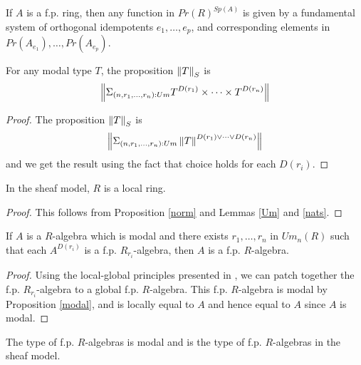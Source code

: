     \begin{corollary}
      If $A$ is a f.p. ring, then any function in $Pr(R)^{Sp(A)}$ is given by
      a fundamental system of orthogonal idempotents $e_1,\dots,e_p$, and corresponding elements in $Pr(A_{e_1}),\dots,Pr(A_{e_p})$.
    \end{corollary}
    
    \begin{proposition}\label{norm}
      For any modal type $T$, the proposition $\left\lVert T \right\rVert_S$ is
      $$\left\lVert \Sigma_{(n,r_1,\dots,r_n):Um}T^{D(r_1)}\times\dots\times T^{D(r_n)} \right\rVert$$
    \end{proposition}
    
    \begin{proof}
      The proposition $\left\lVert T \right\rVert_S$ is
      $$\left\lVert \Sigma_{(n,r_1,\dots,r_n):Um}\left\lVert T \right\rVert^{D(r_1)\vee\dots\vee D(r_n)} \right\rVert$$
      and we get the result using the fact that choice holds for each $D(r_i)$.
    \end{proof}
    
    \begin{proposition}
      In the sheaf model, $R$ is a local ring.
    \end{proposition}

    \begin{proof}
      This follows from Proposition \ref{norm} and Lemmas \ref{Um} and \ref{nats}.
    \end{proof}

    \begin{lemma}\label{localfp}
      If $A$ is a $R$-algebra which is modal and there exists $r_1,\dots,r_n$ in $Um_n(R)$ such that each
      $A^{D(r_i)}$ is a f.p. $R_{r_i}$-algebra, then $A$ is a f.p. $R$-algebra.
    \end{lemma}
    
    \begin{proof}
      Using the local-global principles presented in \cite{lombardi-quitte}, we can patch together the f.p. $R_{r_i}$-algebra
      to a global f.p. $R$-algebra. This f.p. $R$-algebra is modal by Proposition \ref{modal}, and is locally equal to $A$
      and hence equal to $A$ since $A$ is modal.
    \end{proof}

    \begin{corollary}
      The type of f.p. $R$-algebras is modal and is the type of f.p. $R$-algebras in the sheaf model.
    \end{corollary}

